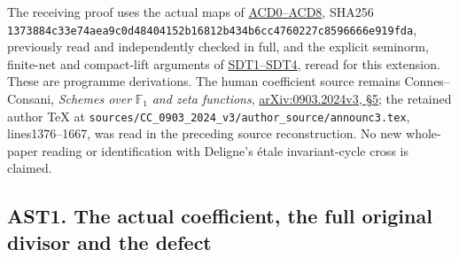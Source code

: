 The receiving proof uses the actual maps of
\href{CC_ADJOINT_DEFECT_CONTINUOUS_DUAL.md}{ACD0--ACD8}, SHA256
\nolinkurl{1373884c33e74aea9c0d48404152b16812b434b6cc4760227c8596666e919fda},
previously read and independently checked in full, and the explicit
seminorm, finite-net and compact-lift arguments of
\href{https://github.com/KokunoYumeto/zeta-function-research-reader/blob/main/workbenches/splitzero-tandem/continuations/20260924-cohomology-weight-and-character-lifts/gct-weight-control/proofs/CC_STRONG_DUAL_TOPOLOGY_AND_JETS.md}{SDT1--SDT4}, reread for this
extension. These are programme derivations. The human coefficient source
remains Connes--Consani, \emph{Schemes over} \(\mathbb F_1\) \emph{and
zeta functions},
\href{https://arxiv.org/abs/0903.2024v3}{arXiv:0903.2024v3, §5}; the
retained author TeX at
\nolinkurl{sources/CC_0903_2024_v3/author_source/announc3.tex},
lines1376--1667, was read in the preceding source reconstruction. No new
whole-paper reading or identification with Deligne's étale
invariant-cycle cross is claimed.

\subsection{AST1. The actual coefficient, the full original divisor and
the
defect}\label{ast1.-the-actual-coefficient-the-full-original-divisor-and-the-defect}

